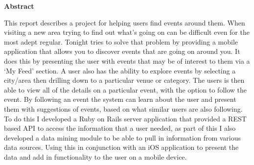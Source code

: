 \thispagestyle{empty}

\begin{center}
    {\LARGE\bf Abstract}
\end{center}

This report describes a project for helping users find events around them. When visiting  a new area trying to find out what's going on can be difficult even for the most adept regular. Tonight tries to solve that problem by providing a mobile application that allows you to discover events that are going on around you. It does this by presenting the user with events that may be of interest to them via a `My Feed' section. A user also has the ability to explore events by selecting a city/area then drilling down to a particular venue or category. The users is then able to view all of the details on a particular event, with the option to follow the event. By following an event the system can learn about the user and present them with suggestions of events, based on what similar users are also following. To do this I developed a Ruby on Rails server application that provided a REST based API to access the information that a user needed, as part of this I also developed a data mining module to be able to pull in information from various data sources. Using this in conjunction with an iOS application to present the data and add in functionality to the user on a mobile device. 